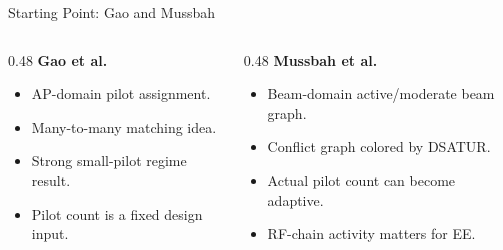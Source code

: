 \documentclass[10pt,aspectratio=169]{beamer}
\newenvironment{tightitemize}{%
    \begin{itemize}
        \setlength{\itemsep}{1pt}
        \setlength{\parskip}{0pt}
        \setlength{\parsep}{0pt}
}{%
    \end{itemize}
}
\begin{document}
\begin{frame}{Starting Point: Gao and Mussbah}
    \small
    \begin{columns}[T,onlytextwidth]
        \begin{column}{0.48\textwidth}
            \textbf{Gao et al.}
            \begin{tightitemize}
                \item AP-domain pilot assignment.
                \item Many-to-many matching idea.
                \item Strong small-pilot regime result.
                \item Pilot count is a fixed design input.
            \end{tightitemize}
        \end{column}
        \begin{column}{0.48\textwidth}
            \textbf{Mussbah et al.}
            \begin{tightitemize}
                \item Beam-domain active/moderate beam graph.
                \item Conflict graph colored by DSATUR.
                \item Actual pilot count can become adaptive.
                \item RF-chain activity matters for EE.
            \end{tightitemize}
        \end{column}
    \end{columns}

    \vspace{0.9em}
    \centering
\end{frame}
\end{document}
